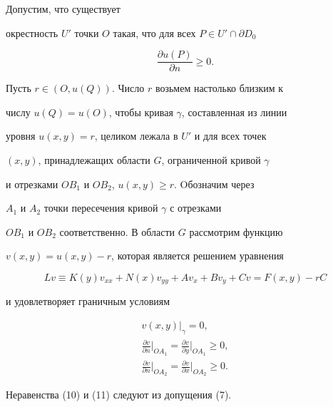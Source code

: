 \begin{pf}


Допустим, что существует 


окрестность $U'$ точки $O$ такая, что для всех $P\in U' 


\cap \partial D_0$


\begin{equation}


\frac{\partial u(P)}{\partial n}\ge 0.


\end{equation}


Пусть $r\in (O,u(Q))$. Число $r$ возьмем настолько близким к 


числу $u(Q)=u(O)$, чтобы кривая $\gamma$, составленная из линии 


уровня $u(x,y)=r$, целиком лежала в $U'$ и для всех точек 


$(x,y)$, принадлежащих области $G$, ограниченной кривой $\gamma$ 


и отрезками $OB_1$ и $OB_2$, $u(x,y)\ge r$. Oбозначим через 


$A_1$ и $A_2$ точки пересечения кривой $\gamma$ с отрезками 


$OB_1$ и $OB_2$ соответственно. В области $G$ рассмотрим функцию 


$v(x,y)=u(x,y)-r$, которая является решением уравнения 


\begin{equation}


Lv\equiv K(y)v_{xx}+N(x)v_{yy}+Av_x+Bv_y+Cv=F(x,y)-rC


\end{equation}


и удовлетворяет граничным условиям


\begin{gather}


v(x,y)|_{\gamma }=0,\\


%


\frac{\partial v}{\partial n}\bigg|_{OA_1}=\frac{\partial 


v}{\partial y}\bigg|_{OA_1}\ge 0,\\


%


\frac{\partial v}{\partial n}\bigg|_{OA_2}=\frac{\partial 


v}{\partial x}\bigg|_{OA_2}\ge 0.


\end{gather}


Неравенства (10) и (11) следуют из допущения (7).



\end{pf}
